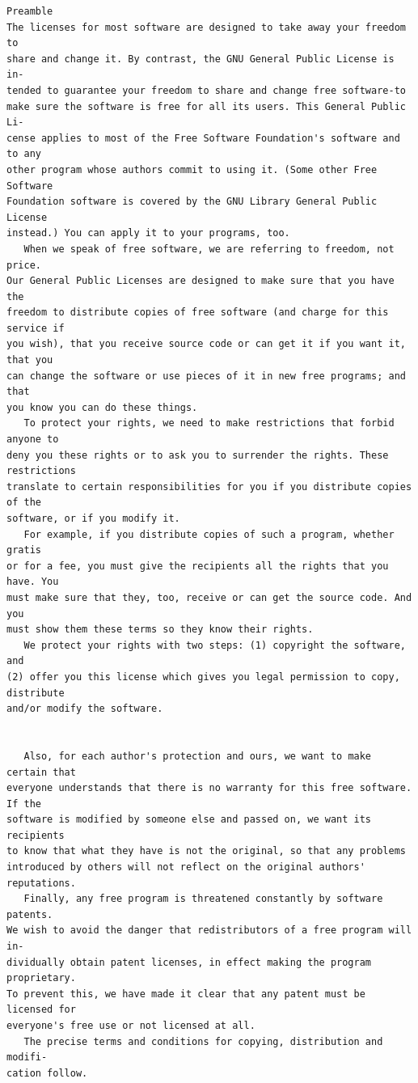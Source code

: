 \documentclass[11pt]{report}
\begin{document}
\begin{appendix}
\begin{verbatim}
Preamble
The licenses for most software are designed to take away your freedom to
share and change it. By contrast, the GNU General Public License is in-
tended to guarantee your freedom to share and change free software-to
make sure the software is free for all its users. This General Public Li-
cense applies to most of the Free Software Foundation's software and to any
other program whose authors commit to using it. (Some other Free Software
Foundation software is covered by the GNU Library General Public License
instead.) You can apply it to your programs, too.
   When we speak of free software, we are referring to freedom, not price.
Our General Public Licenses are designed to make sure that you have the
freedom to distribute copies of free software (and charge for this service if
you wish), that you receive source code or can get it if you want it, that you
can change the software or use pieces of it in new free programs; and that
you know you can do these things.
   To protect your rights, we need to make restrictions that forbid anyone to
deny you these rights or to ask you to surrender the rights. These restrictions
translate to certain responsibilities for you if you distribute copies of the
software, or if you modify it.
   For example, if you distribute copies of such a program, whether gratis
or for a fee, you must give the recipients all the rights that you have. You
must make sure that they, too, receive or can get the source code. And you
must show them these terms so they know their rights.
   We protect your rights with two steps: (1) copyright the software, and
(2) offer you this license which gives you legal permission to copy, distribute
and/or modify the software.


   Also, for each author's protection and ours, we want to make certain that
everyone understands that there is no warranty for this free software. If the
software is modified by someone else and passed on, we want its recipients
to know that what they have is not the original, so that any problems
introduced by others will not reflect on the original authors' reputations.
   Finally, any free program is threatened constantly by software patents.
We wish to avoid the danger that redistributors of a free program will in-
dividually obtain patent licenses, in effect making the program proprietary.
To prevent this, we have made it clear that any patent must be licensed for
everyone's free use or not licensed at all.
   The precise terms and conditions for copying, distribution and modifi-
cation follow.


\end{verbatim}
\end{appendix}
\end{document}
